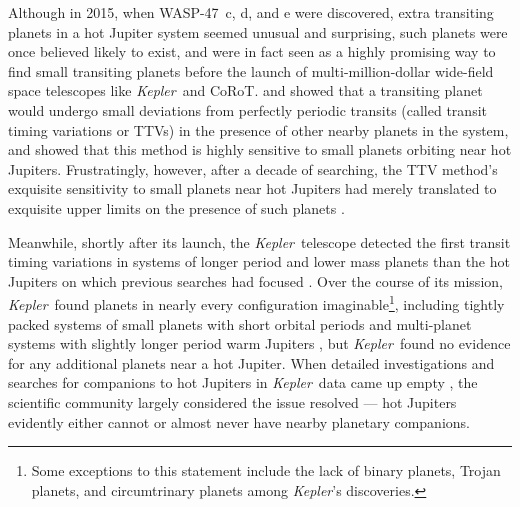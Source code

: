 \documentclass{emulateapj}
\newcommand{\Kepler}{{\it Kepler}}
\newcommand{\thisstar}{WASP-47}
\begin{document}
Although in 2015, when \thisstar\ c, d, and e were discovered, extra transiting planets in a hot Jupiter system seemed unusual and surprising, such planets were once believed likely to exist, and were in fact seen as a highly promising way to find small transiting planets before the launch of multi-million-dollar wide-field space telescopes like \Kepler\ and CoRoT. \citet{holmanmurray} and \citet{agol} showed that a transiting planet would undergo small deviations from perfectly periodic transits (called transit timing variations or TTVs) in the presence of other nearby planets in the system, and \citet{steffenagol} showed that this method is highly sensitive to small planets orbiting near hot Jupiters. Frustratingly, however, after a decade of searching, the TTV method's exquisite sensitivity to small planets near hot Jupiters had merely translated to exquisite upper limits on the presence of such planets \citep[especially in mean motion resonances with the hot Jupiter,][]{steffenagol, millerricci, collins}. 

Meanwhile, shortly after its launch, the \Kepler\ telescope detected the first transit timing variations in systems of longer period and lower mass planets than the hot Jupiters on which previous searches had focused \citep{kepler9, kepler11}. Over the course of its mission, \Kepler\ found planets in nearly every configuration imaginable\footnote{Some exceptions to this statement include the lack of binary planets, Trojan planets,  and circumtrinary planets among \Kepler's discoveries.}, including tightly packed systems of small planets with short orbital periods \citep{muirhead} and multi-planet systems with slightly longer period warm Jupiters \citep{bonomo, sanchisojedausp, huangwarmjupiter}, but \Kepler\ found no evidence for any additional planets near a hot Jupiter. When detailed investigations and searches for companions to hot Jupiters in \Kepler\ data came up empty \citep{steffenconstraints}, the scientific community largely considered the issue resolved --- hot Jupiters evidently either cannot or almost never have nearby planetary companions.
\end{document}
